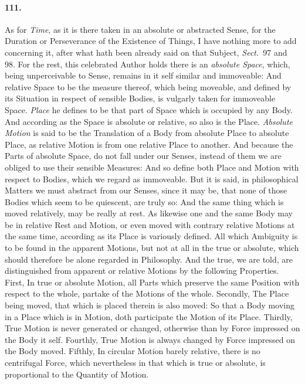 \documentclass[]{article}
\newenvironment{sectionbody}{}{}
\begin{document}
\begin{sectionbody}
\paragraph{111.} As for \emph{Time}, as it is there taken in an absolute or
abstracted Sense, for the Duration or Perseverance of the
Existence of Things, I have nothing more to add concerning it,
after what hath been already said on that Subject,
\emph{Sect.}\ 97 and 98.
For the rest, this celebrated Author holds there is an
\emph{absolute Space}, which, being unperceivable to Sense,
remains in it self similar and immoveable: And relative Space to
be the measure thereof, which being moveable, and defined by its
Situation in respect of sensible Bodies, is vulgarly taken for
immoveable Space.  \emph{Place} he defines to be that part of
Space which is occupied by any Body.  And according as the Space
is absolute or relative, so also is the Place.  \emph{Absolute
Motion} is said to be the Translation of a Body from absolute
Place to absolute Place, as relative Motion is from one relative
Place to another.  And because the Parts of absolute Space, do
not fall under our Senses, instead of them we are obliged to use
their sensible Measures: And so define both Place and Motion with
respect to Bodies, which we regard as immoveable.  But it is
said, in philosophical Matters we must abstract from our Senses,
since it may be, that none of those Bodies which seem to be
quiescent, are truly so: And the same thing which is moved
relatively, may be really at rest.  As likewise one and the same
Body may be in relative Rest and Motion, or even moved with
contrary relative Motions at the same time, according as its
Place is variously defined.  All which Ambiguity is to be found
in the apparent Motions, but not at all in the true or absolute,
which should therefore be alone regarded in Philosophy.  And the
true, we are told, are distinguished from apparent or relative
Motions by the following Properties.  First, In true or absolute
Motion, all Parts which preserve the same Position with respect
to the whole, partake of the Motions of the whole.  Secondly, The
Place being moved, that which is placed therein is also moved: So
that a Body moving in a Place which is in Motion, doth
participate the Motion of its Place.  Thirdly, True Motion is
never generated or changed, otherwise than by Force impressed on
the Body it self.  Fourthly, True Motion is always changed by
Force impressed on the Body moved.  Fifthly, In circular Motion
barely relative, there is no centrifugal Force, which
nevertheless in that which is true or absolute, is proportional
to the Quantity of Motion.




\end{sectionbody}
\end{document}
